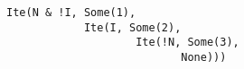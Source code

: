 \begin{lstlisting}[style=reclojureScala]
Ite(N & !I, Some(1),
            Ite(I, Some(2),
                    Ite(!N, Some(3),
                           None)))
\end{lstlisting}
